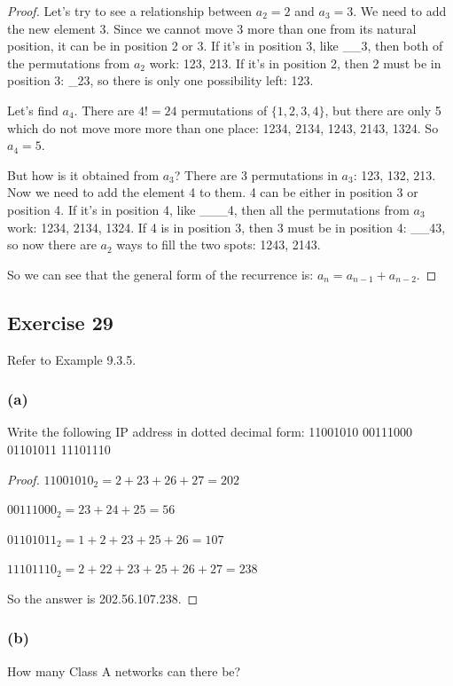 \documentclass[14pt]{extarticle}
\begin{document}
\begin{proof}
     Let's try to see a relationship between \(a_2 = 2\) and \(a_3 = 3\). We need to add the new element 3. Since we
     cannot move 3 more than one from its natural position, it can be in position 2 or 3. If it's in position 3, like
     \_\_3, then both of the permutations from \(a_2\) work: 123, 213. If it's in position 2, then 2 must be in position
     3: \_23, so there is only one possibility left: 123.

     Let's find $a_4$. There are \(4! = 24\) permutations of \(\{1,2,3,4\}\), but there are only 5 which do not move more
     more than one place: 1234, 2134, 1243, 2143, 1324. So \(a_4 = 5\).

     But how is it obtained from \(a_3\)? There are 3 permutations in $a_3$: 123, 132, 213. Now we need to add
     the element 4 to them. 4 can be either in position 3 or position 4. If it's in position 4, like \_\_\_4, then all
     the permutations from $a_3$ work: 1234, 2134, 1324. If 4 is in position 3, then 3 must be in position 4: \_\_43, so now
     there are $a_2$ ways to fill the two spots: 1243, 2143.

     So we can see that the general form of the recurrence is: \(a_n = a_{n-1} + a_{n-2}\).
\end{proof}

\subsection{Exercise 29}
Refer to Example 9.3.5.

\subsubsection{(a)}
Write the following IP address in dotted decimal form: 11001010 00111000 01101011 11101110

\begin{proof}
     \(11001010_2 = 2 + 23 + 26 + 27 = 202\)

     \(00111000_2 = 23 + 24 + 25 = 56\)

     \(01101011_2 = 1 + 2 + 23 + 25 + 26 = 107\)

     \(11101110_2 = 2 + 22 + 23 + 25 + 26 + 27 = 238\)

     So the answer is 202.56.107.238.
\end{proof}

\subsubsection{(b)}
How many Class A networks can there be?
\end{document}
